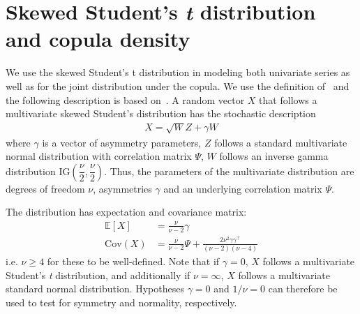 
\section{Skewed Student's \emph{t} distribution and copula density} %
\label{app:ghstmv}

We use the skewed Student's t distribution in modeling both univariate series as well as for the joint distribution under the copula. We use the definition of~\textcite{Hansen1994} and the following description is based on~\textcite{ChristoffersenLanglois2013}. A random vector $X$ that follows a multivariate skewed Student's distribution has the stochastic description
\begin{align}
  X = \sqrt{W}Z + \gamma W
\end{align}
where $\gamma$ is a vector of asymmetry parameters, $Z$ follows a standard multivariate normal distribution with correlation matrix $\Psi$, $W$ follows an inverse gamma distribution $\text{IG}(\dfrac{\nu}{2}, \dfrac{\nu}{2})$. Thus, the parameters of the multivariate distribution are degrees of freedom $\nu$, asymmetries $\gamma$ and an underlying correlation matrix $\Psi$.

The distribution has expectation and covariance matrix:
\begin{align}
  \mathbb{E}[X] &= \frac{\nu}{\nu - 2} \gamma \\
  \text{Cov}(X) &=
    \frac{\nu}{\nu - 2} \Psi +
    \frac{2 \nu^2 \gamma \gamma^\top}{(\nu - 2)(\nu - 4)}
\end{align}
i.e. $\nu \geq 4$ for these to be well-defined. Note that if $\gamma = 0$, $X$ follows a multivariate Student's \emph{t} distribution, and additionally if $\nu = \infty$, $X$ follows a multivariate standard normal distribution. Hypotheses $\gamma = 0$ and $1/\nu = 0$ can therefore be used to test for symmetry and normality, respectively.


